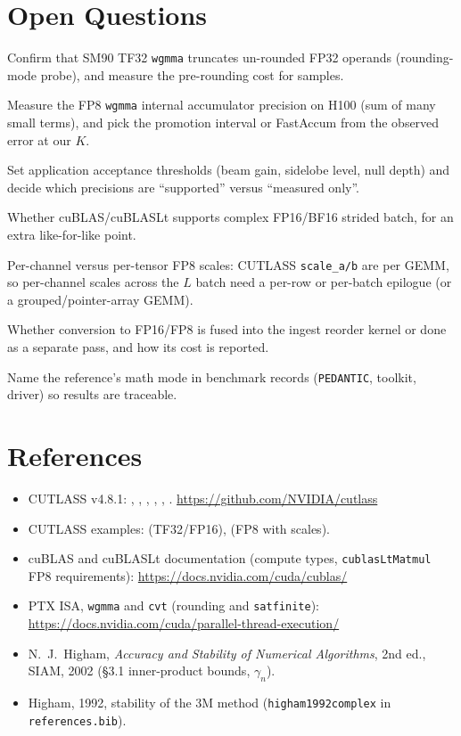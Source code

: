 \documentclass[10pt,letterpaper]{article}
\begin{document}
\section{Open Questions}
\begin{todo}
  \item Confirm that SM90 TF32 \texttt{wgmma} truncates un-rounded FP32 operands (rounding-mode probe), and measure the pre-rounding cost for samples.
  \item Measure the FP8 \texttt{wgmma} internal accumulator precision on H100 (sum of many small terms), and pick the promotion interval or FastAccum from the observed error at our $K$.
  \item Set application acceptance thresholds (beam gain, sidelobe level, null depth) and decide which precisions are ``supported'' versus ``measured only''.
  \item Whether cuBLAS/cuBLASLt supports complex FP16/BF16 strided batch, for an extra like-for-like point.
  \item Per-channel versus per-tensor FP8 scales: CUTLASS \texttt{scale\_a/b} are per GEMM, so per-channel scales across the $L$ batch need a per-row or per-batch epilogue (or a grouped/pointer-array GEMM).
  \item Whether conversion to FP16/FP8 is fused into the ingest reorder kernel or done as a separate pass, and how its cost is reported.
  \item Name the reference's math mode in benchmark records (\texttt{PEDANTIC}, toolkit, driver) so results are traceable.
\end{todo}

\section*{References}
\begin{itemize}
  \item CUTLASS v4.8.1: , , , , , . \url{https://github.com/NVIDIA/cutlass}
  \item CUTLASS examples:  (TF32/FP16),  (FP8 with scales).
  \item cuBLAS and cuBLASLt documentation (compute types, \texttt{cublasLtMatmul} FP8 requirements): \url{https://docs.nvidia.com/cuda/cublas/}
  \item PTX ISA, \texttt{wgmma} and \texttt{cvt} (rounding and \texttt{satfinite}): \url{https://docs.nvidia.com/cuda/parallel-thread-execution/}
  \item N.~J.~Higham, \emph{Accuracy and Stability of Numerical Algorithms}, 2nd ed., SIAM, 2002 (\S3.1 inner-product bounds, $\gamma_n$).
  \item Higham, 1992, stability of the 3M method (\texttt{higham1992complex} in \texttt{references.bib}).
\end{itemize}
\end{document}
